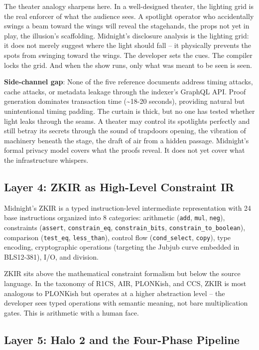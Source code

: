 \documentclass[
  11pt,
  openany]{report}
\renewcommand{\textbf}[1]{{\bfseries\color{MidnightBold}#1}}
\begin{document}
The theater analogy sharpens here. In a well-designed theater, the lighting grid
is the real enforcer of what the audience sees. A spotlight operator who
accidentally swings a beam toward the wings will reveal the stagehands, the
props not yet in play, the illusion's scaffolding. Midnight's disclosure
analysis is the lighting grid: it does not merely suggest where the light should
fall -- it physically prevents the spots from swinging toward the wings. The
developer sets the cues. The compiler locks the grid. And when the show runs,
only what was meant to be seen is seen.

\textbf{Side-channel gap}: None of the five reference documents address timing
attacks, cache attacks, or metadata leakage through the indexer's GraphQL API.
Proof generation dominates transaction time (\textasciitilde18-20 seconds),
providing natural but unintentional timing padding. The curtain is thick, but no
one has tested whether light leaks through the seams. A theater may control its
spotlights perfectly and still betray its secrets through the sound of trapdoors
opening, the vibration of machinery beneath the stage, the draft of air from a
hidden passage. Midnight's formal privacy model covers what the proofs reveal.
It does not yet cover what the infrastructure whispers.

\subsection{Layer 4: ZKIR as High-Level Constraint
IR}\label{layer-4-zkir-as-high-level-constraint-ir}

Midnight's ZKIR is a typed instruction-level intermediate representation with 24
base instructions organized into 8 categories: arithmetic (\texttt{add},
\texttt{mul}, \texttt{neg}), constraints (\texttt{assert},
\texttt{constrain\_eq}, \texttt{constrain\_bits},
\texttt{constrain\_to\_boolean}), comparison (\texttt{test\_eq},
\texttt{less\_than}), control flow (\texttt{cond\_select}, \texttt{copy}), type
encoding, cryptographic operations (targeting the Jubjub curve embedded in
BLS12-381), I/O, and division.

ZKIR sits above the mathematical constraint formalism but below the source
language. In the taxonomy of R1CS, AIR, PLONKish, and CCS, ZKIR is most
analogous to PLONKish but operates at a higher abstraction level -- the
developer sees typed operations with semantic meaning, not bare multiplication
gates. This is arithmetic with a human face.

\subsection{Layer 5: Halo 2 and the Four-Phase
Pipeline}\label{layer-5-halo-2-and-the-four-phase-pipeline}
\end{document}
